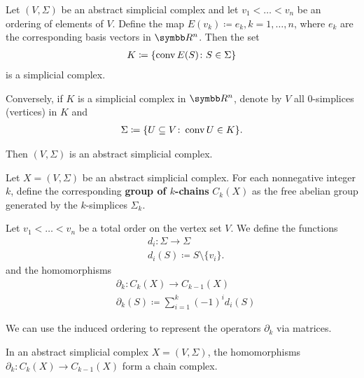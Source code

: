 \begin{proposition}\label{thm:abstract_simplicial_complex_iff_simplicial_complex}
  Let \( (V, \Sigma) \) be an abstract simplicial complex and let \( v_1 < \ldots < v_n \) be an ordering of elements of \( V \). Define the map \( E(v_k) \coloneqq e_k, k = 1, \ldots, n \), where \( e_k \) are the corresponding basis vectors in \( \BB{R^n} \). Then the set
  \begin{align*}
    K \coloneqq \{ \operatorname{conv} E(S) \colon S \in \Sigma \}
  \end{align*}
  is a simplicial complex.

  Conversely, if \( K \) is a simplicial complex in \( \BB{R^n} \), denote by \( V \) all \( 0 \)-simplices (vertices) in \( K \) and
  \begin{align*}
    \Sigma \coloneqq \{ U \subseteq V \colon \operatorname{conv} U \in K \}.
  \end{align*}

  Then \( (V, \Sigma) \) is an abstract simplicial complex.
\end{proposition}

\begin{definition}\label{def:group_of_chains}\cite[262]{Carlsson2009}
  Let \( X = (V, \Sigma) \) be an abstract simplicial complex. For each nonnegative integer \( k \), define the corresponding \textbf{group of \( k \)-chains} \( C_k(X) \) as the free abelian group generated by the \( k \)-simplices \( \Sigma_k \).

  Let \( v_1 < \ldots < v_n \) be a total order on the vertex set \( V \). We define the functions
  \begin{align*}
    &d_i: \Sigma \to \Sigma \\
    &d_i(S) \coloneqq S \setminus \{ v_i \}.
  \end{align*}
  and the homomorphisms
  \begin{align*}
    &\partial_k: C_k(X) \to C_{k-1}(X) \\
    &\partial_k(S) \coloneqq \sum_{i=1}^k (-1)^i d_i(S)
  \end{align*}

  We can use the induced ordering to represent the operators \( \partial_k \) via matrices.
\end{definition}

\begin{proposition}\label{def:abstract_simplicial_chain_complex}
  In an abstract simplicial complex \( X = (V, \Sigma) \), the homomorphisms \( \partial_k: C_k(X) \to C_{k-1}(X) \) form a chain complex.
\end{proposition}

